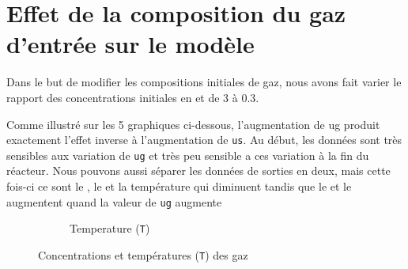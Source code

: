 \documentclass[11pt]{report}
\begin{document}
        \section{Effet de la composition du gaz d'entrée sur le modèle}
            Dans le but de modifier les compositions initiales de gaz,
            nous avons fait varier le rapport des concentrations initiales en  et  de 3 à 0.3.

            Comme illustré sur les 5 graphiques ci-dessous, l'augmentation de ug produit exactement l'effet 
            inverse à l'augmentation de \verb|us|. Au début, les données sont très sensibles aux variation de \verb|ug| 
            et très peu sensible a ces variation à la fin du réacteur. Nous pouvons aussi séparer les données 
            de sorties en deux, mais cette fois-ci ce sont le , le  et la température qui diminuent 
            tandis que le  et le  augmentent quand la valeur de \verb|ug| augmente
            \begin{figure}[ht]
                \centering
                \begin{subfigure}[t]{0.325\textwidth}
                    \centering
                    
                    \caption{}
                    \label{graph:con:C0:CH4}
                \end{subfigure}
                \hfill
                \begin{subfigure}[t]{0.325\textwidth}
                    \centering
                    
                    \caption{}
                    \label{graph:con:C0:H2}
                \end{subfigure}
                \hfill
                \begin{subfigure}[t]{0.325\textwidth}
                    \centering
                    
                    \caption{}
                    \label{graph:con:C0:CO}
                \end{subfigure}
                \hfill
                \begin{subfigure}[t]{0.325\textwidth}
                    \centering
                    
                    \caption{}
                    \label{graph:con:C0:CO2}
                \end{subfigure}
                \begin{subfigure}[t]{0.325\textwidth}
                    \centering
                    
                    \caption{Temperature (\texttt{T})}
                    \label{graph:con:C0:T}
                \end{subfigure}
                \caption{Concentrations et températures (\texttt{T}) des gaz}
                \label{graph:con:C0}
            \end{figure}
\end{document}
